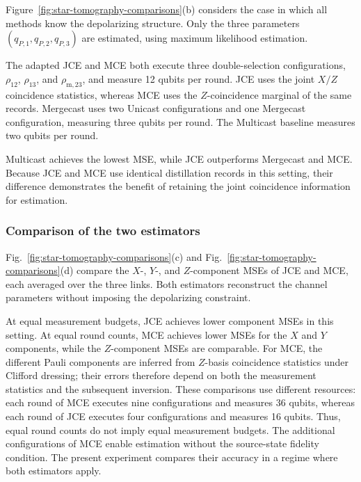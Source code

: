 Figure~\ref{fig:star-tomography-comparisons}(b) considers
the case in which all methods know the depolarizing structure.
Only the three parameters $(q_{P,1},q_{P,2},q_{P,3})$
are estimated, using maximum likelihood estimation.

The adapted JCE and MCE both execute three double-selection
configurations, $\rho_{12}$, $\rho_{13}$, and $\rho_{\mathrm m,23}$,
and measure 12 qubits per round.
JCE uses the joint $X/Z$ coincidence statistics, whereas
MCE uses the $Z$-coincidence marginal of the same records.
Mergecast uses two Unicast configurations and one Mergecast
configuration, measuring three qubits per round.
The Multicast baseline \cite{Andrade2024QNT} measures two
qubits per round.


Multicast achieves the lowest MSE, while JCE outperforms
Mergecast and MCE.
Because JCE and MCE use identical distillation records
in this setting, their difference demonstrates the benefit
of retaining the joint coincidence information for estimation.








\subsubsection{Comparison of the two estimators}
Fig.~\ref{fig:star-tomography-comparisons}(c) and Fig.~\ref{fig:star-tomography-comparisons}(d) compare the
$X$-, $Y$-, and $Z$-component MSEs of JCE and MCE,
each averaged over the three links. Both estimators
reconstruct the channel parameters without imposing
the depolarizing constraint.

At equal measurement budgets, JCE achieves lower
component MSEs in this setting.
At equal round counts, MCE achieves lower MSEs for
the $X$ and $Y$ components, while the $Z$-component
MSEs are comparable.
For MCE, the different Pauli components are inferred
from $Z$-basis coincidence statistics under Clifford
dressing; their errors therefore depend on both the
measurement statistics and the subsequent inversion.
These comparisons use different resources: each round
of MCE executes nine configurations and measures
36 qubits, whereas each round of JCE executes four
configurations and measures 16 qubits.
Thus, equal round counts do not imply equal
measurement budgets.
The additional configurations of MCE enable estimation
without the source-state fidelity condition.
The present experiment compares their accuracy in
a regime where both estimators apply.

